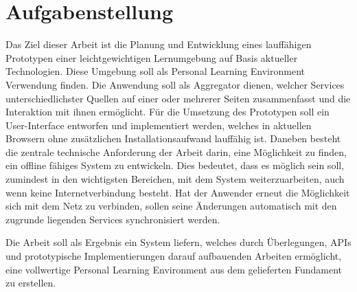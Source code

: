 \section{Aufgabenstellung}
Das Ziel dieser Arbeit ist die Planung und Entwicklung eines lauffähigen Prototypen einer leichtgewichtigen Lernumgebung auf Basis aktueller Technologien. Diese Umgebung soll als Personal Learning Environment Verwendung finden. Die Anwendung soll als Aggregator dienen, welcher Services unterschiedlichster Quellen auf einer oder mehrerer Seiten zusammenfasst und die Interaktion mit ihnen ermöglicht. Für die Umsetzung des Prototypen soll ein User-Interface entworfen und implementiert werden, welches in aktuellen Browsern ohne zusätzlichen Installationsaufwand lauffähig ist. Daneben besteht die zentrale technische Anforderung der Arbeit darin, eine Möglichkeit zu finden, ein offline fähiges System zu entwickeln. Dies bedeutet, dass es möglich sein soll, zumindest in den wichtigsten Bereichen, mit dem System weiterzuarbeiten, auch wenn keine Internetverbindung besteht. Hat der Anwender erneut die Möglichkeit sich mit dem Netz zu verbinden, sollen seine Änderungen automatisch mit den zugrunde liegenden Services synchronisiert werden.

Die Arbeit soll als Ergebnis ein System liefern, welches durch Überlegungen, APIs und prototypische Implementierungen darauf aufbauenden Arbeiten ermöglicht, eine vollwertige Personal Learning Environment aus dem gelieferten Fundament zu erstellen.

